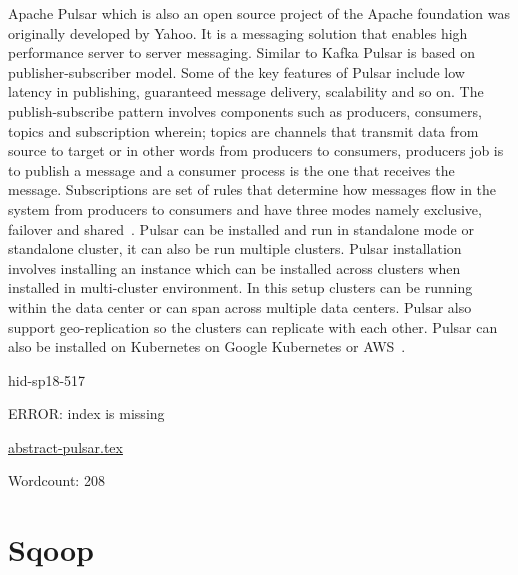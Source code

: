 Apache Pulsar which is also an open source project of the Apache 
foundation was originally developed by Yahoo. It is a messaging 
solution that enables high performance server to server messaging. 
Similar to Kafka Pulsar is based on publisher-subscriber model. 
Some of the key features of Pulsar include low latency in 
publishing, guaranteed message delivery, scalability and so on. 
The publish-subscribe pattern involves components such as 
producers, consumers, topics and subscription wherein; topics 
are channels that transmit data from source to target or in other 
words from producers to consumers, producers job is to publish a 
message and a consumer process is the one that receives the message. 
Subscriptions are set of rules that determine how messages flow in 
the system from producers to consumers and have three modes namely 
exclusive, failover and shared~\cite{hid-sp18-517-pulsar-apache}.
Pulsar can be installed and run in standalone mode or standalone 
cluster, it can also be run multiple clusters. Pulsar installation 
involves installing an instance which can be installed across clusters
when installed in multi-cluster environment. In this setup clusters can
be running within the data center or can span across multiple data centers.
Pulsar also support geo-replication so the clusters can replicate with each 
other. Pulsar can also be installed on Kubernetes on Google Kubernetes or 
AWS~\cite{hid-sp18-517-pulsar-apache}.


\begin{IU}

hid-sp18-517

ERROR: index is missing

\href{https://github.com/cloudmesh-community/hid-sp18-517/blob/master//technology/abstract-pulsar.tex}{abstract-pulsar.tex}

 

Wordcount: 208

\end{IU}

\section{Sqoop}

